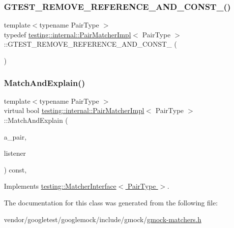 \subsubsection{\texorpdfstring{G\+T\+E\+S\+T\+\_\+\+R\+E\+M\+O\+V\+E\+\_\+\+R\+E\+F\+E\+R\+E\+N\+C\+E\+\_\+\+A\+N\+D\+\_\+\+C\+O\+N\+S\+T\+\_\+()}{GTEST\_REMOVE\_REFERENCE\_AND\_CONST\_()}}
{\footnotesize\ttfamily template$<$typename Pair\+Type $>$ \\
typedef \hyperlink{classtesting_1_1internal_1_1_pair_matcher_impl}{testing\+::internal\+::\+Pair\+Matcher\+Impl}$<$ Pair\+Type $>$\+::G\+T\+E\+S\+T\+\_\+\+R\+E\+M\+O\+V\+E\+\_\+\+R\+E\+F\+E\+R\+E\+N\+C\+E\+\_\+\+A\+N\+D\+\_\+\+C\+O\+N\+S\+T\+\_\+ (\begin{DoxyParamCaption}\item[{Pair\+Type}]{ }\end{DoxyParamCaption})}

\mbox{\label{classtesting_1_1internal_1_1_pair_matcher_impl_a1bba47f97cbf50a1f6331d3f7bfd47a1}} 
\subsubsection{\texorpdfstring{Match\+And\+Explain()}{MatchAndExplain()}}
{\footnotesize\ttfamily template$<$typename Pair\+Type $>$ \\
virtual bool \hyperlink{classtesting_1_1internal_1_1_pair_matcher_impl}{testing\+::internal\+::\+Pair\+Matcher\+Impl}$<$ Pair\+Type $>$\+::Match\+And\+Explain (\begin{DoxyParamCaption}\item[{Pair\+Type}]{a\+\_\+pair,  }\item[{\hyperlink{classtesting_1_1_match_result_listener}{Match\+Result\+Listener} $\ast$}]{listener }\end{DoxyParamCaption}) const\hspace{0.3cm}{\ttfamily [inline]}, {\ttfamily [virtual]}}



Implements \hyperlink{classtesting_1_1_matcher_interface_a296b43607cd99d60365f0e6a762777cf}{testing\+::\+Matcher\+Interface$<$ Pair\+Type $>$}.



The documentation for this class was generated from the following file\+:\begin{DoxyCompactItemize}
\item 
vendor/googletest/googlemock/include/gmock/\hyperlink{gmock-matchers_8h}{gmock-\/matchers.\+h}\end{DoxyCompactItemize}
